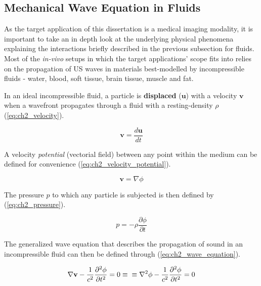 \subsection{Mechanical Wave Equation in Fluids}
\label{subsec:ch2_2_mechanical_wave_equation}

As the target application of this dissertation is a medical imaging modality, it is 
important to take an in depth look at the underlying physical phenomena explaining the 
interactions briefly described in the previous subsection for fluids. Most of the \textit{in-vivo} 
setups in which the target applications' scope fits into relies on the propagation of US waves 
in materials best-modelled by incompressible fluids - water, blood, soft tissue, brain 
tissue, muscle and fat. 

In an ideal incompressible fluid, a particle is \textbf{displaced} ($\textbf{u}$)
with a velocity $\textbf{v}$ when a wavefront propagates through a fluid
with a resting-density $\rho$ (\ref{eq:ch2_velocity}).

\begin{equation}
  \textbf{v} = \frac{d \textbf{u}}{dt}
\label{eq:ch2_velocity}
\end{equation}

A velocity \textit{potential} (vectorial field) between any point 
within the medium can be defined for convenience 
(\ref{eq:ch2_velocity_potential}).

\begin{equation}
  \textbf{v} = \nabla \phi
  \label{eq:ch2_velocity_potential}
\end{equation}

The pressure $p$ to which any particle is subjected
is then defined by (\ref{eq:ch2_pressure}).

\begin{equation}
  p = -\rho \frac{\partial \phi}{\partial t}
  \label{eq:ch2_pressure}
\end{equation}

The generalized wave equation that describes the propagation of sound
in an incompressible fluid can then be defined through (\ref{eq:ch2_wave_equation}).

\begin{equation}
  \nabla \textbf{v} - \frac{1}{c^2} \frac{\partial^2 \phi}{\partial t^2} = 0 \equiv \\ 
  \equiv \nabla^2\phi - \frac{1}{c^2} \frac{\partial^2 \phi}{\partial t^2} = 0
  \label{eq:ch2_wave_equation}
\end{equation}

